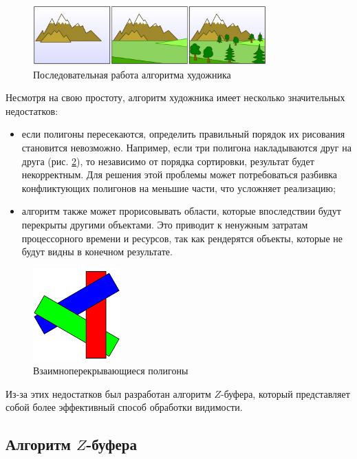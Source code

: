 \begin{figure}[h] 
	\centering
	\includegraphics[width=0.8\textwidth]{images/painter.png}
	\caption{Последовательная работа алгоритма художника} 
	\label{fig:painter-example} 
\end{figure}

Несмотря на свою простоту, алгоритм художника имеет несколько значительных недостатков:
\begin{itemize}[label=--]
	\item если полигоны пересекаются, определить правильный порядок их рисования становится невозможно. Например, если три полигона накладываются друг на друга (рис. \ref{fig:painter-problem}), то независимо от порядка сортировки, результат будет некорректным. Для решения этой проблемы может потребоваться разбивка конфликтующих полигонов на меньшие части, что усложняет реализацию;
	\item алгоритм также может прорисовывать области, которые впоследствии будут перекрыты другими объектами. Это приводит к ненужным затратам процессорного времени и ресурсов, так как рендерятся объекты, которые не будут видны в конечном результате.
\end{itemize}

\begin{figure}[h] 
	\centering
	\includegraphics[width=0.3\textwidth]{images/painter-problem.png}
	\caption{Взаимноперекрывающиеся полигоны} 
	\label{fig:painter-problem} 
\end{figure}

Из-за этих недостатков был разработан алгоритм $Z$-буфера, который представляет собой более эффективный способ обработки видимости.

\subsection{Алгоритм $Z$-буфера}

